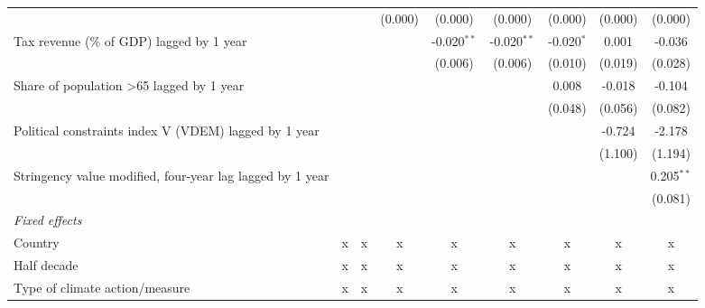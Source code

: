 \begin{tabular}{lcccccccc}
                                                                     &             &              & (0.000)     & (0.000)       & (0.000)       & (0.000)       & (0.000)      & (0.000)\\   
   Tax revenue (\% of GDP) lagged by 1 year                          &             &              &             & -0.020$^{**}$ & -0.020$^{**}$ & -0.020$^{*}$  & 0.001        & -0.036\\   
                                                                     &             &              &             & (0.006)       & (0.006)       & (0.010)       & (0.019)      & (0.028)\\   
   Share of population >65 lagged by 1 year                          &             &              &             &               &               & 0.008         & -0.018       & -0.104\\   
                                                                     &             &              &             &               &               & (0.048)       & (0.056)      & (0.082)\\   
   Political constraints index V (VDEM) lagged by 1 year             &             &              &             &               &               &               & -0.724       & -2.178\\   
                                                                     &             &              &             &               &               &               & (1.100)      & (1.194)\\   
   Stringency value modified, four-year lag lagged by 1 year         &             &              &             &               &               &               &              & 0.205$^{**}$\\   
                                                                     &             &              &             &               &               &               &              & (0.081)\\   
   \emph{Fixed effects}\\
   Country                                                           & x           & x            & x           & x             & x             & x             & x            & x\\  
   Half decade                                                       & x           & x            & x           & x             & x             & x             & x            & x\\  
   Type of climate action/measure                                    & x           & x            & x           & x             & x             & x             & x            & x\\  

\end{tabular}
